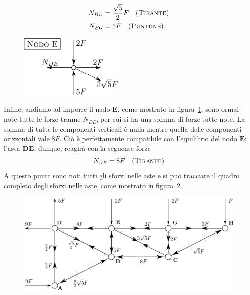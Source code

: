 \begin{align*}
N_{BD} &= \frac{\sqrt{5}}{2}F \quad (\textup{\textsc{Tirante}}) \\
N_{EG} &= 5F \quad (\textup{\textsc{Puntone}}) 
\end{align*}
\renewcommand{\thefigure}{9.1~-~8}
\begin{figure}[h!]
\centering
\includegraphics[width=0.45\textwidth]{Immagini/Parte_9/Esercizio9_1/Esercizio9_1_8.pdf}
\caption{}
\label{Esercizio9-1-8}
\end{figure}
Infine, andiamo ad imporre il nodo $\mathbf{E}$, come mostrato in figura~\ref{Esercizio9-1-8}; sono ormai note tutte le forze tranne $N_{DE}$, per cui si ha una somma di forze tutte note. La somma di tutte le componenti verticali è nulla mentre quella delle componenti orizzontali vale $8F$. Ciò è perfettamente compatibile con l'equilibrio del nodo $\mathbf{E}$; l'asta $\mathbf{D}\mathbf{E}$, dunque, reagirà con la seguente forza
\begin{equation*}
N_{DE} = 8F \quad (\textup{\textsc{Tirante}}) 
\end{equation*}
A questo punto sono noti tutti gli sforzi nelle aste e si può tracciare il quadro completo degli sforzi nelle aste, come mostrato in figura~\ref{Esercizio9-1-9}.
\renewcommand{\thefigure}{9.1~-~9}
\begin{figure}[ht]
\centering
\includegraphics[width=\textwidth]{Immagini/Parte_9/Esercizio9_1/Esercizio9_1_9.pdf}
\caption{}
\label{Esercizio9-1-9}
\end{figure}
